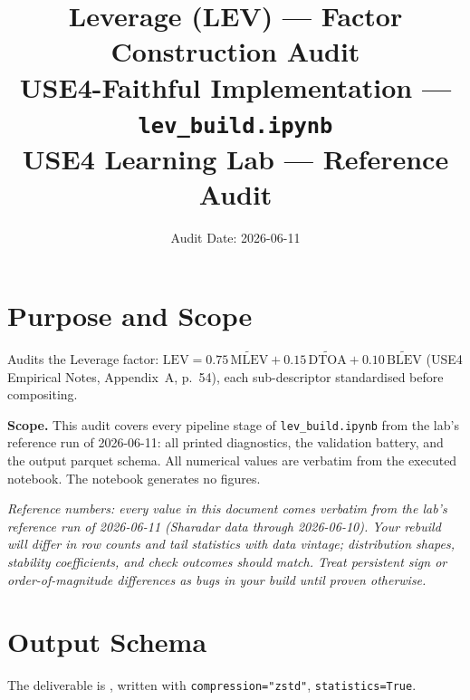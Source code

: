 \documentclass[11pt,a4paper]{article}
\title{\textbf{Leverage (LEV) --- Factor Construction Audit}\\[2pt]
\large USE4-Faithful Implementation --- \texttt{lev\_build.ipynb}\\[4pt]
\normalsize USE4 Learning Lab --- Reference Audit}
\author{Audit Date: 2026-06-11}
\date{}
\newcommand{\NOTE}[1]{\textcolor{note}{\textit{#1}}}
\begin{document}
\maketitle
\tableofcontents
\newpage

\section{Purpose and Scope}

Audits the Leverage factor:
$\mathrm{LEV} = 0.75\,\widetilde{\mathrm{MLEV}} + 0.15\,\widetilde{\mathrm{DTOA}}
+ 0.10\,\widetilde{\mathrm{BLEV}}$ (USE4 Empirical Notes, Appendix~A, p.~54),
each sub-descriptor standardised before compositing.

\smallskip
\textbf{Scope.} This audit covers every pipeline stage of
\texttt{lev\_build.ipynb} from the lab's reference run of 2026-06-11: all printed diagnostics, the
validation battery, and the output parquet schema. All numerical values are
verbatim from the executed notebook. The notebook generates no figures.

\NOTE{Reference numbers: every value in this document comes verbatim from the lab's reference run of 2026-06-11 (Sharadar data through 2026-06-10). Your rebuild will differ in row counts and tail statistics with data vintage; distribution shapes, stability coefficients, and check outcomes should match. Treat persistent sign or order-of-magnitude differences as bugs in your build until proven otherwise.}


\section{Output Schema}

The deliverable is , written with
\texttt{compression="zstd"}, \newline\texttt{statistics=True}.
\end{document}
